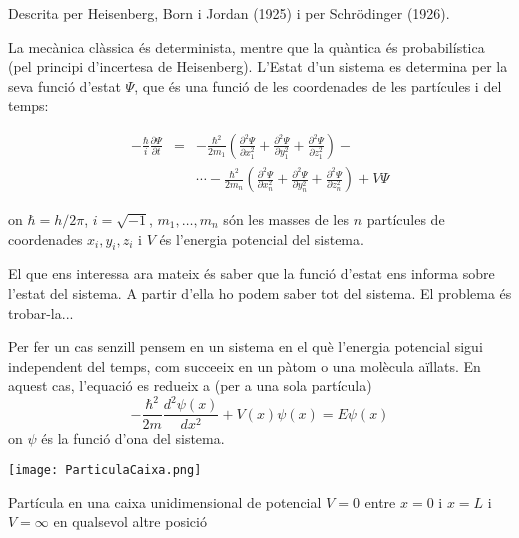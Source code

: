 Descrita per Heisenberg, Born i Jordan (1925) i per Schrödinger (1926). 

La mecànica clàssica és determinista, mentre que la quàntica és probabilística (pel principi d'incertesa de Heisenberg). L'Estat d'un sistema es determina per la seva funció d'estat $\Psi$, que és una funció de les coordenades de les partícules i del temps:

\begin{eqnarray}
-\frac{\hbar}{i} \frac{\partial \Psi}{\partial t}&=&-\frac{\hbar^2}{2m_1}\left(\frac{\partial^2\Psi}{\partial x_1^2}+\frac{\partial^2\Psi}{\partial y_1^2}+\frac{\partial^2\Psi}{\partial z_1^2} \right)-\\
 & & \cdots -\frac{\hbar^2}{2m_n}\left(\frac{\partial^2\Psi}{\partial x_n^2}+\frac{\partial^2\Psi}{\partial y_n^2}+\frac{\partial^2\Psi}{\partial z_n^2} \right) + V \Psi
\end{eqnarray}

on $\hbar=h/2\pi$, $i=\sqrt{-1}$, $m_1,\dots , m_n$ són les masses de les $n$ partícules de coordenades $x_i,y_i,z_i$ i $V$ és l'energia potencial del sistema.

El que ens interessa ara mateix és saber que la funció d'estat ens informa sobre l'estat del sistema.
A partir d'ella ho podem saber tot del sistema. El problema és trobar-la...

Per fer un cas senzill pensem en un sistema en el què l'energia potencial sigui independent del temps, com succeeix en un pàtom o una molècula aïllats. En aquest cas, l'equació es redueix a (per a una sola partícula)
\[
-\frac{\hbar^2}{2m}\frac{d^2 \psi(x)}{dx^2}+V(x)\psi(x)=E\psi(x)
\label{Eq:Schr1x}
\]
on $\psi$ és la funció d'ona del sistema.

\begin{marginfigure}
\centering
\texttt{[image: ParticulaCaixa.png]}
\caption{Partícula en una caixa unidimensional de potencial $V=0$ entre $x=0$ i $x=L$ i $V=\infty$ en qualsevol altre posició}
\label{fig:ParticulaCaixa}
\end{marginfigure}

